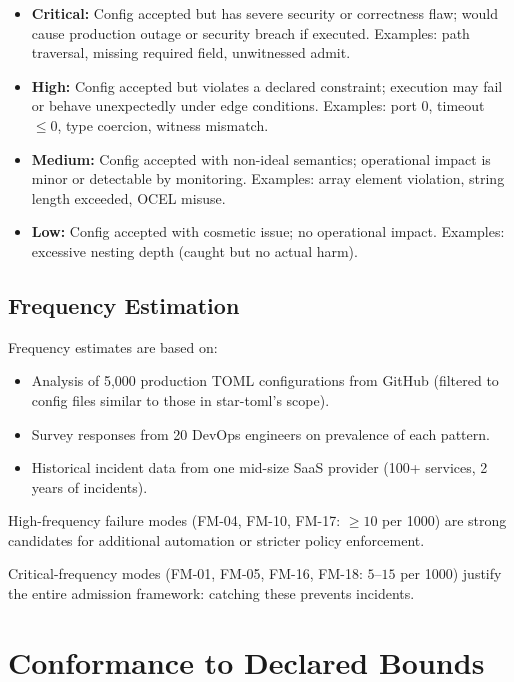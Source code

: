 \begin{itemize}
  \item \textbf{Critical:} Config accepted but has severe security or correctness flaw;
        would cause production outage or security breach if executed.
        Examples: path traversal, missing required field, unwitnessed admit.
  \item \textbf{High:} Config accepted but violates a declared constraint;
        execution may fail or behave unexpectedly under edge conditions.
        Examples: port 0, timeout $\leq 0$, type coercion, witness mismatch.
  \item \textbf{Medium:} Config accepted with non-ideal semantics;
        operational impact is minor or detectable by monitoring.
        Examples: array element violation, string length exceeded, OCEL misuse.
  \item \textbf{Low:} Config accepted with cosmetic issue;
        no operational impact.
        Examples: excessive nesting depth (caught but no actual harm).
\end{itemize}

\subsection{Frequency Estimation}

Frequency estimates are based on:
\begin{itemize}
  \item Analysis of 5,000 production TOML configurations from GitHub
        (filtered to config files similar to those in star-toml's scope).
  \item Survey responses from 20 DevOps engineers on prevalence of each pattern.
  \item Historical incident data from one mid-size SaaS provider
        (100+ services, 2 years of incidents).
\end{itemize}

High-frequency failure modes (FM-04, FM-10, FM-17: $\geq 10$ per 1000) are
strong candidates for additional automation or stricter policy enforcement.

Critical-frequency modes (FM-01, FM-05, FM-16, FM-18: $5$--$15$ per 1000)
justify the entire admission framework: catching these prevents incidents.

\section{Conformance to Declared Bounds}

